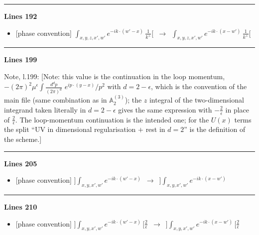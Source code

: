 \documentclass[10pt]{article}
\newenvironment{notebox}{\def\FrameCommand{{\color{notebar}\vrule width 1.5pt}\hspace{6pt}}\MakeFramed{\advance\hsize-\width\FrameRestore}\small}{\endMakeFramed}
\def\mf#1{\mathbb{#1}}
\begin{document}
\noindent\rule{\linewidth}{0.3pt}\par\noindent\textbf{Lines 192} \par
\begin{itemize}[leftmargin=2.2em,itemsep=1pt,topsep=2pt]
\item[\textbf{l.192}] \textsf{\small [phase convention]} $\displaystyle \int_{x,y,z,x',w'}e^{-ik\cdot(w'-x)}\,\frac{1}{k^{+}}[$\ $\longrightarrow$\ $\displaystyle \int_{x,y,z,x',w'}e^{-ik\cdot(x-w')}\,\frac{1}{k^{+}}[$
\end{itemize}
\noindent\rule{\linewidth}{0.3pt}\par\noindent\textbf{Lines 199}\par
\begin{notebox}\textsf{\small Note, l.199:} [Note: this value is the continuation in the loop momentum, $-(2\pi)^{2}\mu^{\epsilon}\int\frac{d^{d}p}{(2\pi)^{d}}$ $e^{ip\cdot(y-x)}/p^{2}$ with $d=2-\epsilon$, which is the convention of the main file (same combination as in $\mf{A}^{(3)}_{2}$); the $z$ integral of the two-dimensional integrand taken literally in $d=2-\epsilon$ gives the same expression with $-\frac{2}{\epsilon}$ in place of $\frac{2}{\epsilon}$. The loop-momentum continuation is the intended one; for the $U(x)$ terms the split ``UV in dimensional regularisation $+$ rest in $d=2$'' is the definition of the scheme.]\end{notebox}
\noindent\rule{\linewidth}{0.3pt}\par\noindent\textbf{Lines 205} \par
\begin{itemize}[leftmargin=2.2em,itemsep=1pt,topsep=2pt]
\item[\textbf{l.205}] \textsf{\small [phase convention]} $\displaystyle ]\int_{x,y,x',w'}e^{-ik\cdot(w'-x)}$\ $\longrightarrow$\ $\displaystyle ]\int_{x,y,x',w'}e^{-ik\cdot(x-w')}$
\end{itemize}
\noindent\rule{\linewidth}{0.3pt}\par\noindent\textbf{Lines 210} \par
\begin{itemize}[leftmargin=2.2em,itemsep=1pt,topsep=2pt]
\item[\textbf{l.210}] \textsf{\small [phase convention]} $\displaystyle ]\int_{x,y,x',w'}e^{-ik\cdot(w'-x)}\,[\frac{2}{\epsilon}$\ $\longrightarrow$\ $\displaystyle ]\int_{x,y,x',w'}e^{-ik\cdot(x-w')}\,[\frac{2}{\epsilon}$
\end{itemize}
\end{document}
